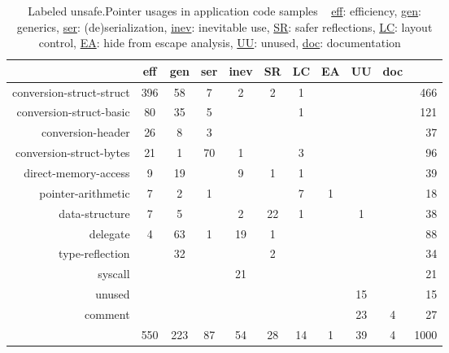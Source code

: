 \begin{table*}[t]
    \centering
    \caption[Labeled unsafe.Pointer usages in application code samples Answers \ref{rq:purpose}]%
    {Labeled unsafe.Pointer usages in application code samples \newline \tiny ~ \newline \small
        \underline{eff}: efficiency, \underline{gen}: generics, \underline{ser}: (de)serialization,
        \underline{inev}: inevitable use, \underline{SR}: safer reflections, \underline{LC}: layout control,
        \underline{EA}: hide from escape analysis, \underline{UU}: unused,
        \underline{doc}: documentation \newline \tiny ~}
    \label{tbl:dataset-classes-app}
    \begin{tabular}{r|ccccccccc|r}
                                          &  eff &  gen & ser & inev &  SR &  LC &  EA &  UU & doc &  {}   \\ \hline
                 conversion-struct-struct &  396 &   58 &   7 &    2 &   2 &   1 &    &     &     &   466 \\
        \rowcolor{verylightgray}
                  conversion-struct-basic &   80 &   35 &   5 &      &     &   1 &    &     &     &   121 \\
                        conversion-header &   26 &    8 &   3 &      &     &     &    &     &     &    37 \\
        \rowcolor{verylightgray}
                  conversion-struct-bytes &   21 &    1 &  70 &    1 &     &   3 &    &     &     &    96 \\
                     direct-memory-access &    9 &   19 &     &    9 &   1 &   1 &    &     &     &    39 \\
        \rowcolor{verylightgray}
                       pointer-arithmetic &    7 &    2 &   1 &      &     &   7 &  1 &     &     &    18 \\
                           data-structure &    7 &    5 &     &    2 &  22 &   1 &    &   1 &     &    38 \\
        \rowcolor{verylightgray}
                                 delegate &    4 &   63 &   1 &   19 &   1 &     &    &     &     &    88 \\
                          type-reflection &      &   32 &     &      &   2 &     &    &     &     &    34 \\
        \rowcolor{verylightgray}
                                  syscall &      &      &     &   21 &     &     &    &     &     &    21 \\
                                   unused &      &      &     &      &     &     &    &  15 &     &    15 \\
        \rowcolor{verylightgray}
                                  comment &      &      &     &      &     &     &    &  23 &   4 &    27 \\ \hline
                                       {} &  550 &  223 &  87 &   54 &  28 &  14 &  1 &  39 &   4 &  1000 \\
    \end{tabular}
\end{table*}